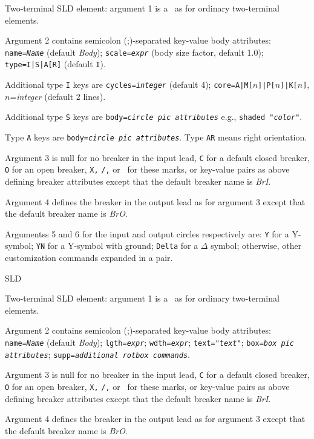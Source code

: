   {Two-terminal SLD element: argument 1 is a \linespec\ as for ordinary
   two-terminal elements.

   Argument 2 contains semicolon (;)-separated key-value body attributes:
   {\tt name={\sl{}Name}} (default {\sl Body});
   {\tt scale={\sl expr}} (body size factor, default 1.0);
   {\tt type=I|S|A[R]} (default {\tt I}).

   Additional type {\tt I} keys are
   {\tt cycles={\sl{}integer}} (default 4);
   {\tt core=A|M[$n$]|P[$n$]|K[$n$]}, $n$={\sl integer} (default 2 lines).

   Additional type {\tt S} keys are
   {\tt body={\sl circle pic attributes}} e.g., {\tt shaded "{\sl color}"}.

   Type {\tt A} keys are
   {\tt body={\sl circle pic attributes}}.  Type {\tt AR} means right
   orientation.

   Argument 3 is null for no breaker in the input lead, {\tt C} for a default
   closed breaker, {\tt O} for an open breaker, {\tt X,} {\tt /,} or \bsl\ for
   these marks, or
   key-value pairs as above defining breaker attributes
   except that the default breaker name is {\sl BrI}.

   Argument 4 defines the breaker in the output lead as for argument 3
   except that the default breaker name is {\sl BrO}.

   Argumentss 5 and 6 for the input and output circles respectively are:
   {\tt Y} for a Y-symbol;
   {\tt YN} for a Y-symbol with ground;
   {\tt Delta} for a $\Delta$ symbol;
   otherwise, other customization commands expanded in a {\tt \lbr\rbr} pair.
   }%
%
%
  {SLD}%
  {Two-terminal SLD element: argument 1 is a \linespec\ as for ordinary
   two-terminal elements.

   Argument 2 contains semicolon (;)-separated key-value body attributes:
   {\tt name={\sl{}Name}} (default {\sl Body});
   {\tt lgth={\sl{}expr}};
   {\tt wdth={\sl{}expr}};
   {\tt text="{\sl{}text}"};
   {\tt box={\sl{}box pic attributes}};
   {\tt supp={\sl{}additional {\tt rotbox} commands}}.

   Argument 3 is null for no breaker in the input lead, {\tt C} for a default
   closed breaker, {\tt O} for an open breaker, {\tt X,} {\tt /,} or \bsl\ for
   these marks, or
   key-value pairs as above defining breaker attributes
   except that the default breaker name is {\sl BrI}.

   Argument 4 defines the breaker in the output lead as for argument 3
   except that the default breaker name is {\sl BrO}.
   \label{sl_ttbox}%
   }%
